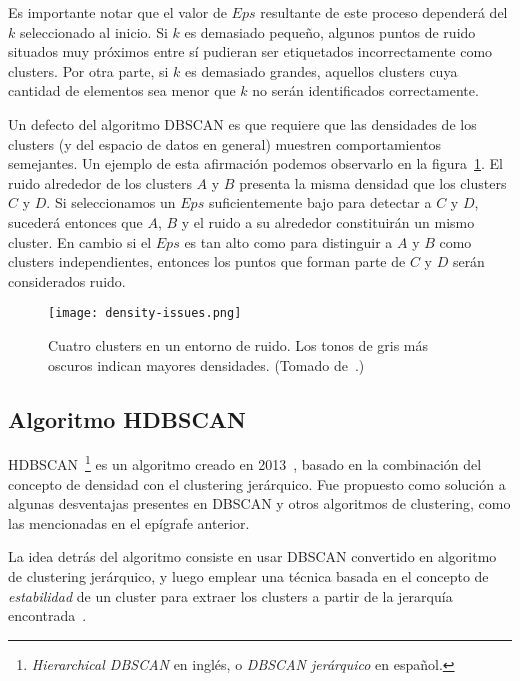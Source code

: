 
Es importante notar que el valor de $Eps$ resultante de este proceso dependerá del $k$ seleccionado al inicio.
Si $k$ es demasiado pequeño, algunos puntos de ruido situados muy próximos entre sí pudieran ser etiquetados incorrectamente como clusters.
Por otra parte, si $k$ es demasiado grandes, aquellos clusters cuya cantidad de elementos sea menor que $k$ no serán identificados correctamente.

Un defecto del algoritmo DBSCAN es que requiere que las densidades de los clusters (y del espacio de datos en general) muestren comportamientos semejantes.
Un ejemplo de esta afirmación podemos observarlo en la figura~\ref{img:density-issues}.
El ruido alrededor de los clusters $A$ y $B$ presenta la misma densidad que los clusters $C$ y $D$.
Si seleccionamos un $Eps$ suficientemente bajo para detectar a $C$ y $D$, sucederá entonces que $A$, $B$ y el ruido a su alrededor constituirán un mismo cluster.
En cambio si el $Eps$ es tan alto como para distinguir a $A$ y $B$ como clusters independientes, entonces los puntos que forman parte de $C$ y $D$ serán considerados ruido.

\begin{figure}[!h]
    \centering
    \texttt{[image: density-issues.png]}
    \caption{Cuatro clusters en un entorno de ruido.
    Los tonos de gris más oscuros indican mayores densidades. (Tomado de~\cite{Tan05}.)}
    \label{img:density-issues}
\end{figure}

\subsection{Algoritmo HDBSCAN}\label{subsec:HDBSCAN}

HDBSCAN~\footnote{\textit{Hierarchical DBSCAN} en inglés, o \textit{DBSCAN jerárquico} en español.} es un algoritmo creado en 2013~\cite{Campello13}, basado en la combinación del concepto de densidad con el clustering jerárquico.
Fue propuesto como solución a algunas desventajas presentes en DBSCAN y otros algoritmos de clustering, como las mencionadas en el epígrafe anterior.

La idea detrás del algoritmo consiste en usar DBSCAN convertido en algoritmo de clustering jerárquico, y luego emplear una técnica basada en el concepto de \textit{estabilidad} de un cluster para extraer los clusters a partir de la jerarquía encontrada~\cite{McInnes17}.

